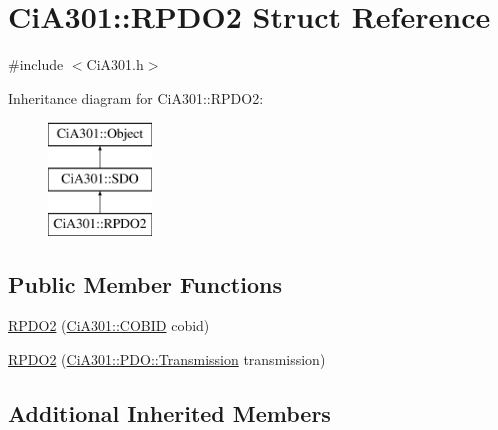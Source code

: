 \hypertarget{struct_ci_a301_1_1_r_p_d_o2}{\section{Ci\-A301\-:\-:R\-P\-D\-O2 Struct Reference}
\label{struct_ci_a301_1_1_r_p_d_o2}
}


{\ttfamily \#include $<$Ci\-A301.\-h$>$}

Inheritance diagram for Ci\-A301\-:\-:R\-P\-D\-O2\-:\begin{figure}[H]
\begin{center}
\leavevmode
\includegraphics[height=3.000000cm]{d1/dcf/struct_ci_a301_1_1_r_p_d_o2}
\end{center}
\end{figure}
\subsection*{Public Member Functions}
\begin{DoxyCompactItemize}
\item 
\hyperlink{struct_ci_a301_1_1_r_p_d_o2_afe7528b47811a3d56da5e409c6ecd265}{R\-P\-D\-O2} (\hyperlink{namespace_ci_a301_aec5b5dbb2b60d2837c60499f6f297aa7}{Ci\-A301\-::\-C\-O\-B\-I\-D} cobid)
\item 
\hyperlink{struct_ci_a301_1_1_r_p_d_o2_a2edbabf13b7822694f1e97b5295925a1}{R\-P\-D\-O2} (\hyperlink{namespace_ci_a301_1_1_p_d_o_a6c7a5941fe4f869dd1703fb7ce7f6549}{Ci\-A301\-::\-P\-D\-O\-::\-Transmission} transmission)
\end{DoxyCompactItemize}
\subsection*{Additional Inherited Members}


